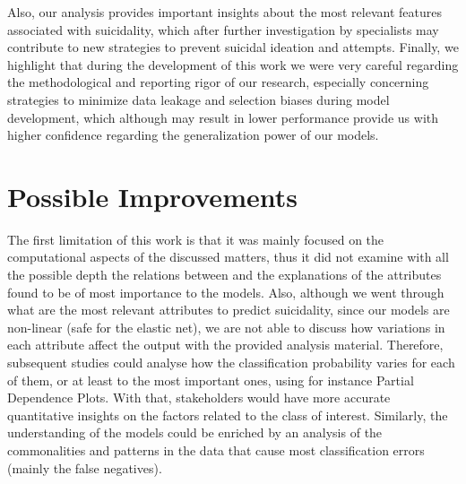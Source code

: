 Also, our analysis provides important insights about the most relevant features associated with suicidality, which after further investigation by specialists may contribute to new strategies to prevent suicidal ideation and attempts.
Finally, we highlight that during the development of this work we were very careful regarding the methodological and reporting rigor of our research, especially concerning strategies to minimize data leakage and selection biases during model development, which although may result in lower performance provide us with higher confidence regarding the generalization power of our models.


\section{Possible Improvements}\label{sec:possible-improvements}

The first limitation of this work is that it was mainly focused on the computational aspects of the discussed matters, thus it did not examine with all the possible depth the relations between and the explanations of the attributes found to be of most importance to the models.
Also, although we went through what are the most relevant attributes to predict suicidality, since our models are non-linear (safe for the elastic net), we are not able to discuss how variations in each attribute affect the output with the provided analysis material.
Therefore, subsequent studies could analyse how the classification probability varies for each of them, or at least to the most important ones, using for instance Partial Dependence Plots.
With that, stakeholders would have more accurate quantitative insights on the factors related to the class of interest.
Similarly, the understanding of the models could be enriched by an analysis of the commonalities and patterns in the data that cause most classification errors (mainly the false negatives).

